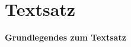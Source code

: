 %
%
%
%
%
%
%
%
%
\section{Textsatz}
\begin{frame}[c]
	\begin{center}
		\huge \textbf{Grundlegendes zum Textsatz}
	\end{center}
\end{frame}

